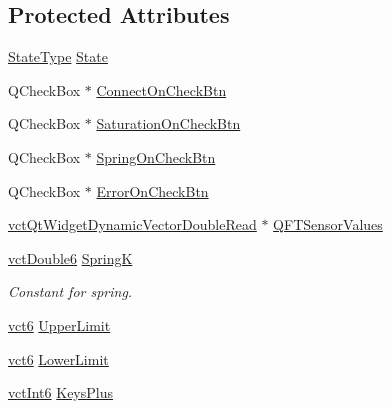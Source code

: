 \subsection*{Protected Attributes}
\begin{DoxyCompactItemize}
\item 
\hyperlink{structsaw_a_t_i_net_f_t_simulator_qt_widget_1_1_state_type}{State\-Type} \hyperlink{classsaw_a_t_i_net_f_t_simulator_qt_widget_a98e7e525e56f3f06f51ad880689b103f}{State}
\item 
Q\-Check\-Box $\ast$ \hyperlink{classsaw_a_t_i_net_f_t_simulator_qt_widget_a187941f4e76c2d242da68c80aabaa0e9}{Connect\-On\-Check\-Btn}
\item 
Q\-Check\-Box $\ast$ \hyperlink{classsaw_a_t_i_net_f_t_simulator_qt_widget_ab16689bde18c8396a7f549c169c052c6}{Saturation\-On\-Check\-Btn}
\item 
Q\-Check\-Box $\ast$ \hyperlink{classsaw_a_t_i_net_f_t_simulator_qt_widget_a7efaeb3f99daea180867d48a82957c05}{Spring\-On\-Check\-Btn}
\item 
Q\-Check\-Box $\ast$ \hyperlink{classsaw_a_t_i_net_f_t_simulator_qt_widget_a1923309b0f6dda1065d03ebe7b1d6977}{Error\-On\-Check\-Btn}
\item 
\hyperlink{vct_qt_forward_declarations_8h_a6cbce1b6d338096215fc40cb0fdfb848}{vct\-Qt\-Widget\-Dynamic\-Vector\-Double\-Read} $\ast$ \hyperlink{classsaw_a_t_i_net_f_t_simulator_qt_widget_a07820174a24bb75533a4457b2f243519}{Q\-F\-T\-Sensor\-Values}
\item 
\hyperlink{vct_fixed_size_vector_types_8h_a26a80e4d58f1201f2bfc347f4ac81bf8}{vct\-Double6} \hyperlink{classsaw_a_t_i_net_f_t_simulator_qt_widget_a6181d17be511dd69e61c9c73f57c340c}{Spring\-K}
\begin{DoxyCompactList}\small\item\em Constant for spring. \end{DoxyCompactList}\item 
\hyperlink{vct_fixed_size_vector_types_8h_abb9fb64cb9696edc946e57a342b9033a}{vct6} \hyperlink{classsaw_a_t_i_net_f_t_simulator_qt_widget_a237d3ab4e9483c63a84c62d47a37a6cb}{Upper\-Limit}
\item 
\hyperlink{vct_fixed_size_vector_types_8h_abb9fb64cb9696edc946e57a342b9033a}{vct6} \hyperlink{classsaw_a_t_i_net_f_t_simulator_qt_widget_adf6651464aa58c6b9bf0a13324e3bc60}{Lower\-Limit}
\item 
\hyperlink{vct_fixed_size_vector_types_8h_a22d0a8625db73e85593a3bced3ea61ce}{vct\-Int6} \hyperlink{classsaw_a_t_i_net_f_t_simulator_qt_widget_a20d4f7346e008ce5f1c5b9c4e4efcffd}{Keys\-Plus}

\end{DoxyCompactItemize}

